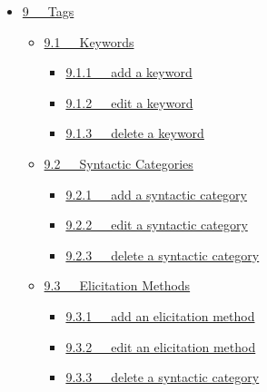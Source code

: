 \documentclass[letterpaper,10pt,english]{sphinxmanual}
\begin{document}
{\begin{minipage}{0.95\linewidth}
\begin{itemize}
\begin{itemize}
\begin{itemize}
\end{itemize}

\end{itemize}

\item {} 
{\hyperref[documentation:tags]{9   Tags}}
\begin{itemize}
\item {} 
{\hyperref[documentation:id20]{9.1   Keywords}}
\begin{itemize}
\item {} 
{\hyperref[documentation:add-a-keyword]{9.1.1   add a keyword}}

\item {} 
{\hyperref[documentation:edit-a-keyword]{9.1.2   edit a keyword}}

\item {} 
{\hyperref[documentation:delete-a-keyword]{9.1.3   delete a keyword}}

\end{itemize}

\item {} 
{\hyperref[documentation:syntactic-categories]{9.2   Syntactic Categories}}
\begin{itemize}
\item {} 
{\hyperref[documentation:add-a-syntactic-category]{9.2.1   add a syntactic category}}

\item {} 
{\hyperref[documentation:edit-a-syntactic-category]{9.2.2   edit a syntactic category}}

\item {} 
{\hyperref[documentation:delete-a-syntactic-category]{9.2.3   delete a syntactic category}}

\end{itemize}

\item {} 
{\hyperref[documentation:elicitation-methods]{9.3   Elicitation Methods}}
\begin{itemize}
\item {} 
{\hyperref[documentation:add-an-elicitation-method]{9.3.1   add an elicitation method}}

\item {} 
{\hyperref[documentation:edit-an-elicitation-method]{9.3.2   edit an elicitation method}}

\item {} 
{\hyperref[documentation:id21]{9.3.3   delete a syntactic category}}

\end{itemize}


\end{itemize}
\end{itemize}
\end{minipage}}
\end{document}
